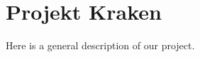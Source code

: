 \documentclass[../../main.tex]{subfiles}
\begin{document}
    \chapter{Projekt Kraken}
    Here is a general description of our project.
    \cite{953350}
    
    
    
\end{document}
